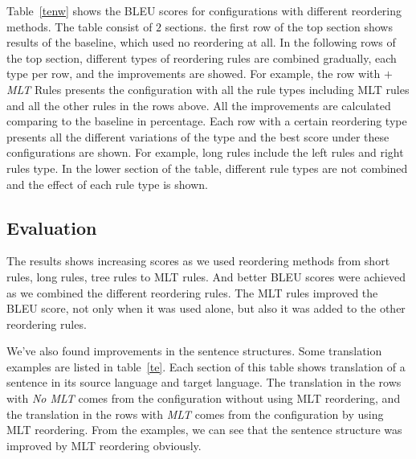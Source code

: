 Table~\ref{tenw} shows the BLEU scores for configurations with different reordering methods. The table consist of $2$ sections. the first row of the top section shows results of the baseline, which used no reordering at all. In the following rows of the top section, different types of reordering rules are combined gradually, each type per row, and the improvements are showed. For example, the row with \emph{$+$MLT} Rules presents the configuration with all the rule types including MLT rules and all the other rules in the rows above. All the improvements are calculated comparing to the baseline in percentage. Each row with a certain reordering type presents all the different variations of the type and the best score under these configurations are shown. For example, long rules include the left rules and right rules type. In the lower section of the table, different rule types are not combined and the effect of each rule type is shown. %

\subsection{Evaluation}

The results shows increasing scores as we used reordering methods from short rules, long rules, tree rules to MLT rules. And better BLEU scores were achieved as we combined the different reordering rules. The MLT rules improved the BLEU score, not only when it was used alone, but also it was added to the other reordering rules. 

We've also found improvements in the sentence structures. Some translation examples are listed in table~\ref{te}. Each section of this table shows translation of a sentence in its source language and target language. The translation in the rows with \emph{No MLT} comes from the configuration without using MLT reordering, and the translation in the rows with \emph{MLT} comes from the configuration by using MLT reordering. From the examples, we can see that the sentence structure was improved by MLT reordering obviously.

